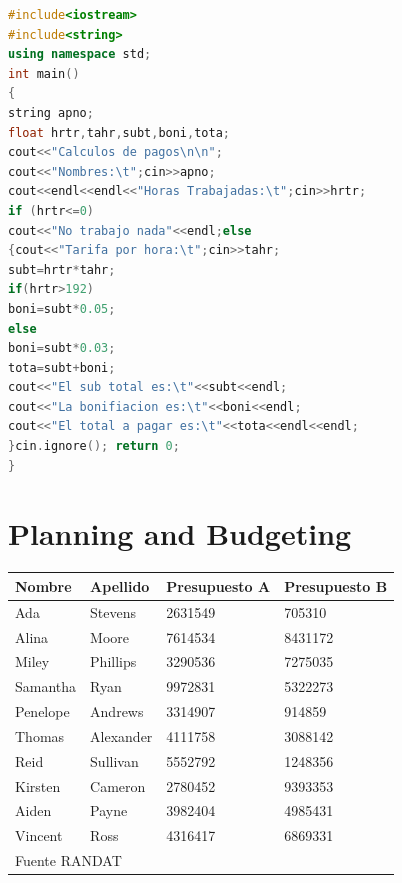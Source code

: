 \documentclass[12pt]{report} %
\begin{document}
\lipsum[50-51]

\begin{lstlisting}[language=C++]
#include<iostream>
#include<string>
using namespace std;
int main()
{
string apno;
float hrtr,tahr,subt,boni,tota;
cout<<"Calculos de pagos\n\n";
cout<<"Nombres:\t";cin>>apno;
cout<<endl<<endl<<"Horas Trabajadas:\t";cin>>hrtr;
if (hrtr<=0)
cout<<"No trabajo nada"<<endl;else
{cout<<"Tarifa por hora:\t";cin>>tahr;
subt=hrtr*tahr;
if(hrtr>192)
boni=subt*0.05;
else
boni=subt*0.03;
tota=subt+boni;
cout<<"El sub total es:\t"<<subt<<endl;
cout<<"La bonifiacion es:\t"<<boni<<endl;
cout<<"El total a pagar es:\t"<<tota<<endl<<endl;
}cin.ignore(); return 0;
}
\end{lstlisting}

\lipsum[51]

\chapter{Planning and Budgeting}

\lipsum[103]

\begin{table} [h]
	{\begin{tabular}{|p{3cm}|p{3cm}|p{3cm}|p{3cm}|}
		\hline
		\rowcolor{gray75}	
		Nombre & Apellido & Presupuesto A & Presupuesto B \\
		\hline
		Ada & Stevens & 2631549 & 705310 \\
		\hline
		Alina & Moore & 7614534 & 8431172 \\
		\hline
		Miley & Phillips & 3290536 & 7275035\\
		\hline
		Samantha & Ryan & 9972831 & 5322273 \\
		\hline
		Penelope & Andrews & 3314907 & 914859\\
		\hline
		Thomas & Alexander & 4111758 & 3088142 \\
		\hline
		Reid & Sullivan & 5552792 & 1248356 \\
		\hline
		Kirsten & Cameron & 2780452 & 9393353 \\
		\hline
		Aiden & Payne & 3982404 & 4985431 \\
		\hline
		Vincent & Ross & 4316417 & 6869331\\
		\hline
		\multicolumn{4}{|l|}{Fuente RANDAT} \\
		\hline
	\end{tabular}}
\end{table}

\lipsum[5-7]	
\end{document}
